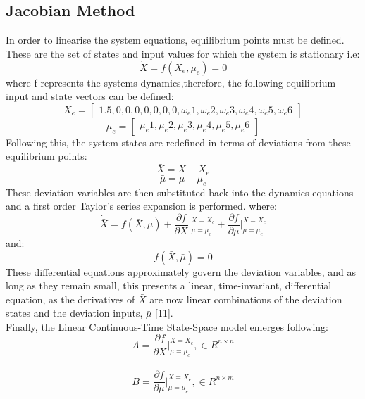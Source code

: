 \documentclass[12pt,a4paper,twoside]{report}
\begin{document}
			\subsection{Jacobian Method}
					
				In order to linearise the system equations, equilibrium points must be defined. These are the set of states and input values for which the system is stationary i.e:
					\[\dot{X} = f(X_e,\mu_e) = 0\]
				where f represents the systems dynamics,therefore, the following equilibrium input and state vectors can be defined:
				$$
					X_e = 
					\begin{bmatrix}
						1.5,0,0,0,0,0,0,0,\omega_e1,\omega_e2,\omega_e3,\omega_e4,\omega_e5,\omega_e6
					\end{bmatrix}
				$$
				$$
					\mu_e = 
					\begin{bmatrix}
						\mu_e1,\mu_e2,\mu_e3,\mu_e4,\mu_e5,\mu_e6
					\end{bmatrix}
				$$
				Following this, the system states are redefined in terms of deviations from these equilibrium points:
					\[\bar{X} = X - X_e\] 
					\[\bar{\mu} = \mu - \mu_e\] 
				These deviation variables are then substituted back into the dynamics equations and a first order Taylor's series expansion is performed. where:
				\begin{equation}
					\dot{\bar{X}} = f(\bar{X},\bar{\mu}) + \frac{\partial f}{\partial X}\bigg\vert_{\mu = \mu_e}^{X = X_e} + \frac{\partial f}{\partial \mu}\bigg\vert_{\mu = \mu_e}^{X = X_e}
				\end{equation}
				and:
					\[ f(\bar{X},\bar{\mu}) = 0 \]
				These differential equations approximately govern the deviation variables, and as long as they remain small, this presents a linear, time-invariant, differential equation, as the derivatives of $\bar{X}$ are now linear combinations of the deviation states and the deviation inputs, $\bar{\mu}$ [11]. 
				\\
				Finally, the Linear Continuous-Time State-Space model emerges following:
				\\
				\begin{equation}
					A = \frac{\partial f}{\partial X}\bigg\vert_{\mu = \mu_e}^{X = X_e}, \in R ^{n\times n}
				\end{equation}
				\\
				\begin{equation}
					B = \frac{\partial f}{\partial \mu}\bigg\vert_{\mu = \mu_e}^{X = X_e} , \in R ^{n\times m}
				\end{equation} 
\end{document}
